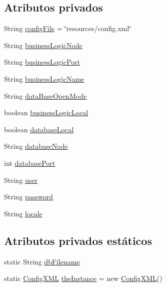 \subsection*{Atributos privados}
\begin{DoxyCompactItemize}
\item 
String \mbox{\hyperlink{classconfiguration_1_1ConfigXML_a4ca9488232e34fa900d770cd14b4e5b2}{config\+File}} = \char`\"{}resources/config.\+xml\char`\"{}
\item 
String \mbox{\hyperlink{classconfiguration_1_1ConfigXML_a8eaef059e5c5b7dc23331ba72c04eb59}{business\+Logic\+Node}}
\item 
String \mbox{\hyperlink{classconfiguration_1_1ConfigXML_ac679ff78a18d6f012cb613d8e8c7ac41}{business\+Logic\+Port}}
\item 
String \mbox{\hyperlink{classconfiguration_1_1ConfigXML_ad0228d23b69947a3e6ad84db4d893369}{business\+Logic\+Name}}
\item 
String \mbox{\hyperlink{classconfiguration_1_1ConfigXML_afaa301de70783638240f5a9a147f615f}{data\+Base\+Open\+Mode}}
\item 
boolean \mbox{\hyperlink{classconfiguration_1_1ConfigXML_ab30a83d21460a743a7a86955de08da3a}{business\+Logic\+Local}}
\item 
boolean \mbox{\hyperlink{classconfiguration_1_1ConfigXML_a6ca52a37fbb4b0994aeb388df59a275f}{database\+Local}}
\item 
String \mbox{\hyperlink{classconfiguration_1_1ConfigXML_a71b31518e099bee7f0eefa043b38d706}{database\+Node}}
\item 
int \mbox{\hyperlink{classconfiguration_1_1ConfigXML_a3766a24ed4f1ffda3f6af14b90100656}{database\+Port}}
\item 
String \mbox{\hyperlink{classconfiguration_1_1ConfigXML_a79e9a3b8602620dbb873ba491f47164a}{user}}
\item 
String \mbox{\hyperlink{classconfiguration_1_1ConfigXML_a719187d1ff6398218cb8f6d7b0f53763}{password}}
\item 
String \mbox{\hyperlink{classconfiguration_1_1ConfigXML_a34c81c18f387adacbf595cee3c0229b0}{locale}}
\end{DoxyCompactItemize}
\subsection*{Atributos privados estáticos}
\begin{DoxyCompactItemize}
\item 
static String \mbox{\hyperlink{classconfiguration_1_1ConfigXML_a421b678aff5893a1927f5257b1becb14}{db\+Filename}}
\item 
static \mbox{\hyperlink{classconfiguration_1_1ConfigXML}{Config\+X\+ML}} \mbox{\hyperlink{classconfiguration_1_1ConfigXML_a7993e8ab35ee8854e832e85bafe85964}{the\+Instance}} = new \mbox{\hyperlink{classconfiguration_1_1ConfigXML}{Config\+X\+ML}}()
\end{DoxyCompactItemize}


